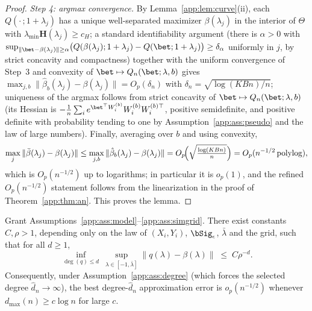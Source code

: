 \begin{proof}
\emph{Step 4: argmax convergence.} By Lemma~\ref{app:lem:curve}(ii), each
$Q(\cdot\,;1+\lambda_j)$ has a unique well-separated maximizer
$\beta(\lambda_j)$ in the interior of $\Theta$ with
$\lambda_{\min}\bm H(\lambda_j)\ge c_H$; a standard identifiability
argument (there is $\alpha>0$ with
$\sup_{\|\bet-\beta(\lambda_j)\|\ge\alpha}
\bigl(Q(\beta(\lambda_j);1+\lambda_j)-Q(\bet;1+\lambda_j)\bigr)\ge\delta_\alpha$
uniformly in $j$, by strict concavity and compactness) together with the
uniform convergence of Step~3 and convexity of
$\bet\mapsto Q_n(\bet;\lambda,b)$ gives
$\max_{j,b}\|\hat\beta_b(\lambda_j)-\beta(\lambda_j)\|
=O_p(\delta_n)$ with $\delta_n=\sqrt{\log(KBn)/n}$; uniqueness of the
argmax follows from strict concavity of
$\bet\mapsto Q_n(\bet;\lambda,b)$ (its Hessian is
$-\frac1n\sum_i e^{\bet^\top W_i^{(b)}}W_i^{(b)}W_i^{(b)\top}$, positive
semidefinite, and positive definite with probability tending to one by
Assumption~\ref{app:ass:pseudo} and the law of large numbers). Finally,
averaging over $b$ and using convexity,
\[
  \max_{j}\|\bar\beta(\lambda_j)-\beta(\lambda_j)\|
  \le \max_{j,b}\|\hat\beta_b(\lambda_j)-\beta(\lambda_j)\|
  =O_p\!\Bigl(\sqrt{\tfrac{\log(KBn)}{n}}\Bigr)=O_p(n^{-1/2}\,\mathrm{polylog}),
\]
which is $O_p(n^{-1/2})$ up to logarithms; in particular it is
$o_p(1)$, and the refined $O_p(n^{-1/2})$ statement follows from the
linearization in the proof of Theorem~\ref{app:thm:an}. This proves the
lemma.
\end{proof}

\begin{lemma}\label{app:lem:approx}
Grant Assumptions~\ref{app:ass:model}--\ref{app:ass:simgrid}. There exist
constants $C,\rho>1$, depending only on the law of $(X_i,Y_i)$,
$\bSig_\epsilon$, $\bar\lambda$ and the grid, such that for all $d\ge 1$,
\[
  \inf_{\deg(q)\le d}\ \sup_{\lambda\in[-1,\bar\lambda]}
  \bigl\|q(\lambda)-\beta(\lambda)\bigr\|
  \;\le\; C\rho^{-d}.
\]
Consequently, under Assumption~\ref{app:ass:degree} (which forces the selected
degree $\hat d_n\to\infty$), the best degree-$\hat d_n$ approximation
error is $o_p(n^{-1/2})$ whenever $d_{\max}(n)\ge c\log n$ for large $c$.
\end{lemma}

